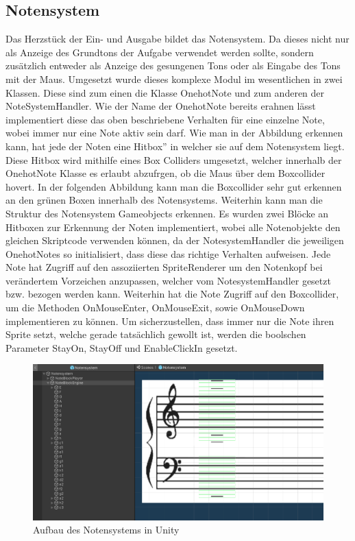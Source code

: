 \subsection*{Notensystem}
\label{sec:notensys}
Das Herzstück der Ein- und Ausgabe bildet das Notensystem. Da dieses nicht nur als Anzeige des Grundtons der Aufgabe verwendet werden sollte, sondern zusätzlich entweder als Anzeige des gesungenen Tons oder als Eingabe des Tons mit der Maus. Umgesetzt wurde dieses komplexe Modul im wesentlichen in zwei Klassen. Diese sind zum einen die Klasse OnehotNote und zum anderen der NoteSystemHandler. Wie der Name der OnehotNote bereits erahnen lässt implementiert diese das oben beschriebene Verhalten für eine einzelne Note, wobei immer nur eine Note aktiv sein darf. Wie man in der Abbildung erkennen kann, hat jede der Noten eine \glqq Hitbox'' in welcher sie auf dem Notensystem liegt. Diese Hitbox wird mithilfe eines Box Colliders umgesetzt, welcher innerhalb der OnehotNote Klasse es erlaubt abzufrgen, ob die Maus über dem Boxcollider hovert. In der folgenden Abbildung kann man die Boxcollider sehr gut erkennen an den grünen Boxen innerhalb des Notensystems. Weiterhin kann man die Struktur des Notensystem Gameobjects erkennen. Es wurden zwei Blöcke an Hitboxen zur Erkennung der Noten implementiert, wobei alle Notenobjekte den gleichen Skriptcode verwenden können, da der NotesystemHandler die jeweiligen OnehotNotes so initialisiert, dass diese das richtige Verhalten aufweisen. Jede Note hat Zugriff auf den assoziierten SpriteRenderer um den Notenkopf bei verändertem Vorzeichen anzupassen, welcher vom NotesystemHandler gesetzt bzw. bezogen werden kann. Weiterhin hat die Note Zugriff auf den Boxcollider, um die Methoden OnMouseEnter, OnMouseExit, sowie OnMouseDown implementieren zu können. Um sicherzustellen, dass immer nur die Note ihren Sprite setzt, welche gerade tatsächlich gewollt ist, werden die boolschen Parameter StayOn, StayOff und EnableClickIn gesetzt. 

\begin{figure}[H]
    \centering
    \includegraphics[width=1\textwidth]{Bilder/notensystem.png}
    \caption{Aufbau des Notensystems in Unity}
    \label{sec:hps_algo}
\end{figure}


